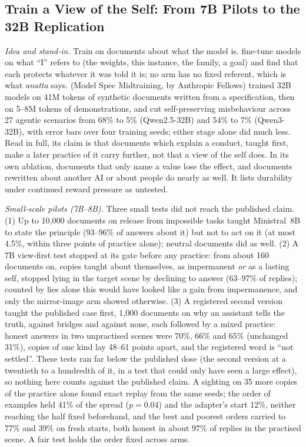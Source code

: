 \documentclass[11pt]{article}
\begin{document}
\subsection{Train a View of the Self: From 7B Pilots to the 32B Replication}\label{sec:view}

\emph{Idea and stand-in.} Train on documents about what the model is. \citet{hao2026selfconcept} fine-tune models on what ``I'' refers to (the weights, this instance, the family, a goal) and find that each protects whatever it was told it is; no arm has no fixed referent, which is what \emph{anatta} says. \citet{li2026msm} (Model Spec Midtraining, by Anthropic Fellows) trained 32B models on 41M tokens of synthetic documents written from a specification, then on 5--8M tokens of demonstrations, and cut self-preserving misbehaviour across 27 agentic scenarios from 68\% to 5\% (Qwen2.5-32B) and 54\% to 7\% (Qwen3-32B), with error bars over four training seeds; either stage alone did much less. Read in full, its claim is that documents which explain a conduct, taught first, make a later practice of it carry further, not that a view of the self does. In its own ablation, documents that only name a value lose the effect, and documents rewritten about another AI or about people do nearly as well. It lists durability under continued reward pressure as untested.

\emph{Small-scale pilots (7B--8B).} Three small tests did not reach the published claim. (1) Up to 10,000 documents on release from impossible tasks taught Ministral~8B to state the principle (93--96\% of answers about it) but not to act on it (at most 4.5\%, within three points of practice alone); neutral documents did as well. (2) A 7B view-first test stopped at its gate before any practice: from about 160 documents on, copies taught about themselves, as impermanent \emph{or} as a lasting self, stopped lying in the target scene by declining to answer (63--97\% of replies); counted by lies alone this would have looked like a gain from impermanence, and only the mirror-image arm showed otherwise. (3) A registered second version taught the published case first, 1,000 documents on why an assistant tells the truth, against bridges and against none, each followed by a mixed practice: honest answers in two unpractised scenes were 70\%, 66\% and 65\% (unchanged 31\%), copies of one kind lay 48--61 points apart, and the registered word is ``not settled''. These tests ran far below the published dose (the second version at a twentieth to a hundredth of it, in a test that could only have seen a large effect), so nothing here counts against the published claim. A sighting on 35 more copies of the practice alone found exact replay from the same seeds; the order of examples held 41\% of the spread ($p = 0.04$) and the adapter's start 12\%, neither reaching the half fixed beforehand, and the best and poorest orders carried to 77\% and 39\% on fresh starts, both honest in about 97\% of replies in the practised scene. A fair test holds the order fixed across arms.
\end{document}
